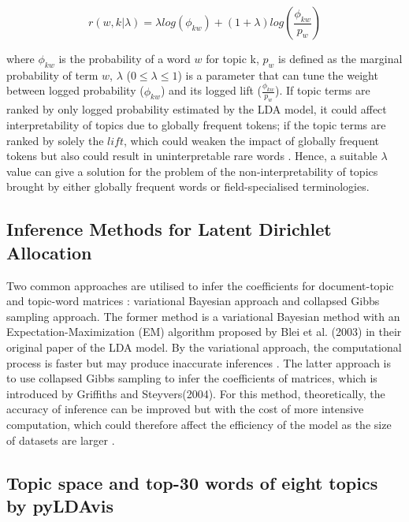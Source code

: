 \begin{equation}
  r(w,k|\lambda) = \lambda log(\phi_{kw}) + (1+\lambda)log(\frac{\phi_{kw}}{p_w})
\end{equation}

where $\phi_{kw}$ is the probability of a word $w$ for topic k, $p_w$ is defined as the marginal probability of term $w$, $\lambda$ ($0 \leq \lambda \leq 1$) is a parameter that can tune the weight between logged probability ($\phi_{kw}$) and its logged lift ($\frac{\phi_{kw}}{p_w}$). If topic terms are ranked by only logged probability estimated by the LDA model, it could affect interpretability of topics due to globally frequent tokens; if the topic terms are ranked by solely the $lift$, which could weaken the impact of globally frequent tokens but also could result in uninterpretable rare words \cite{taddy2011estimation}. Hence, a suitable $\lambda$ value can give a solution for the problem of the non-interpretability of topics brought by either globally frequent words or field-specialised terminologies.

\subsection*{Inference Methods for Latent Dirichlet Allocation}
Two common approaches are utilised to infer the coefficients for document-topic and topic-word matrices \cite{gibbs_lda}: variational Bayesian approach and collapsed Gibbs sampling approach. The former method is a variational Bayesian method with an Expectation-Maximization (EM) algorithm proposed by Blei et al. (2003) \cite{LDA} in their original paper of the LDA model. By the variational approach, the computational process is faster but may produce inaccurate inferences \cite{jordan1999}. The latter approach is to use collapsed Gibbs sampling to infer the coefficients of matrices, which is introduced by Griffiths and Steyvers(2004). For this method, theoretically, the accuracy of inference can be improved but with the cost of more intensive computation, which could therefore affect the efficiency of the model as the size of datasets are larger \cite{gibbs_lda}.

\subsection*{Topic space and top-30 words of eight topics by pyLDAvis}

